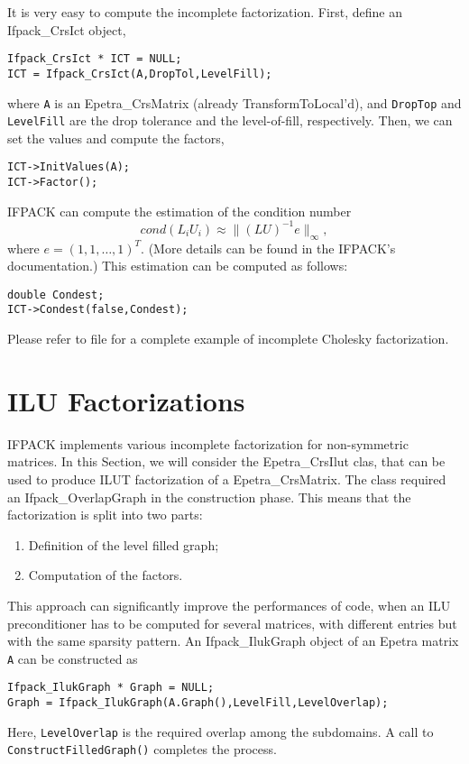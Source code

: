 It is very easy to compute the incomplete factorization. First, define
an Ifpack\_CrsIct object,
\begin{verbatim}
Ifpack_CrsIct * ICT = NULL;
ICT = Ifpack_CrsIct(A,DropTol,LevelFill);
\end{verbatim}
where \verb!A! is an Epetra\_CrsMatrix (already TransformToLocal'd), and
\verb!DropTop! and \verb!LevelFill! are the drop tolerance and the
level-of-fill, respectively. Then, we can set the values and compute the
factors,
\begin{verbatim}
ICT->InitValues(A);
ICT->Factor();
\end{verbatim}

IFPACK can compute the estimation of the condition number
\[
cond(L_i U_i) \approx \|(LU)^{-1} e \|_\infty ,
\]
where $e = (1,1,\dots,1)^T$. (More details can be found in the IFPACK's
documentation.) This estimation can be computed as follows:
\begin{verbatim}
double Condest;
ICT->Condest(false,Condest);
\end{verbatim}
Please refer to file  for a complete example of
incomplete Cholesky factorization.


\section{ILU  Factorizations}
\label{sec:ifpack_ilut}

IFPACK implements various incomplete factorization for non-symmetric
matrices. In this Section, we will consider the Epetra\_CrsIlut clas,
that can be used to produce ILUT factorization of a
Epetra\_CrsMatrix. The class required an Ifpack\_OverlapGraph in the
construction phase. This means that the factorization is split into two
parts:
\begin{enumerate}
\item Definition of the level filled graph;
\item Computation of the factors.
\end{enumerate}
This approach can significantly improve the performances of code, when
an ILU preconditioner has to be computed for several matrices, with
different entries but with the same sparsity pattern. An
Ifpack\_IlukGraph object of an Epetra matrix \verb!A! can be constructed
as
\begin{verbatim}
Ifpack_IlukGraph * Graph = NULL;
Graph = Ifpack_IlukGraph(A.Graph(),LevelFill,LevelOverlap);
\end{verbatim}
Here, \verb!LevelOverlap! is the required overlap among the subdomains.
A call to \verb!ConstructFilledGraph()! completes the process.


